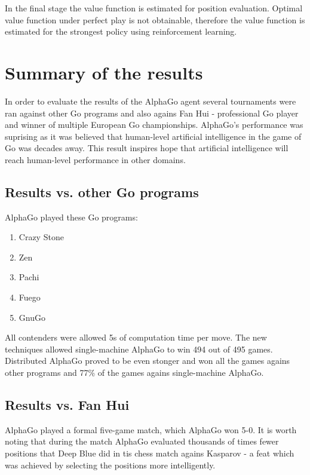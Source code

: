 \documentclass[11pt]{article}
\begin{document}
In the final stage the value function is estimated for position evaluation. Optimal value function under perfect play is not obtainable, therefore the value function is estimated for the strongest policy using reinforcement learning.

\section{Summary of the results}

In order to evaluate the results of the AlphaGo agent several tournaments were ran against other Go programs and also agains Fan Hui - professional Go player and winner of multiple European Go championships. AlphaGo's performance was suprising as it was believed that human-level artificial intelligence in the game of Go was decades away. This result inspires hope that artificial intelligence will reach human-level performance in other domains.

\subsection{Results vs. other Go programs}

AlphaGo played these Go programs:

\begin{enumerate}
  \item Crazy Stone
  \item Zen
  \item Pachi
  \item Fuego
  \item GnuGo
\end{enumerate}

All contenders were allowed 5s of computation time per move. The new techniques allowed single-machine AlphaGo to win 494 out of 495 games. Distributed AlphaGo proved to be even stonger and won all the games agains other programs and 77\% of the games agains single-machine AlphaGo.

\subsection{Results vs. Fan Hui}

AlphaGo played a formal five-game match, which AlphaGo won 5-0. It is worth noting that during the match AlphaGo evaluated thousands of times fewer positions that Deep Blue did in tis chess match agains Kasparov - a feat which was achieved by selecting the positions more intelligently.

\printbibliography 
\end{document}
